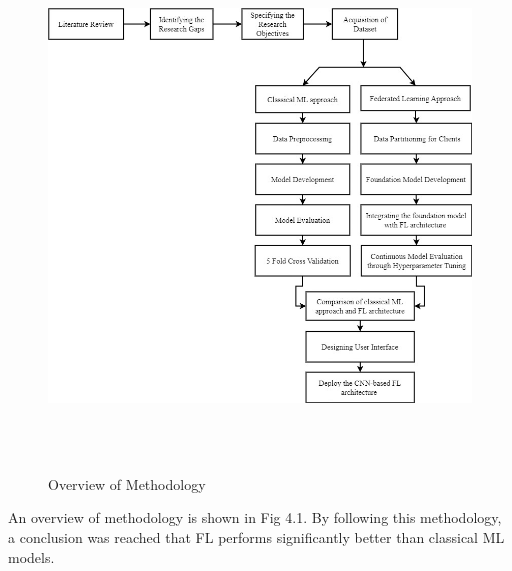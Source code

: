 \begin{figure}[H]
\centering
\includegraphics[width=148mm,height=140mm]{figures/meth.jpg}
\caption{Overview of Methodology}
\label{DLAccuracy}
\end{figure}

An overview of methodology is shown in Fig 4.1. By following this methodology, a conclusion was reached that FL performs significantly better than classical ML models.


\endinput

